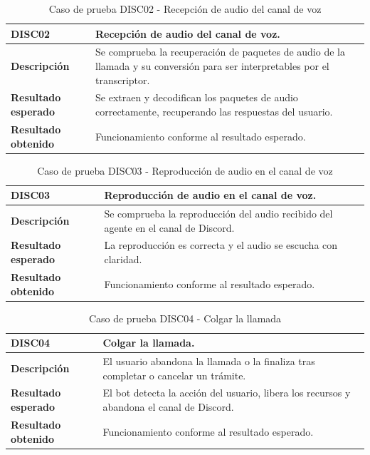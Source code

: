    \begin{table}[H]
        \centering
        \begin{tabular}{|l|p{12cm}|}
        \hline
        \textbf{DISC02} & Recepción de audio del canal de voz. \\ \hline
        \textbf{Descripción} & Se comprueba la recuperación de paquetes de audio de la llamada y su conversión para ser interpretables por el transcriptor. \\ \hline
        \textbf{Resultado esperado} & Se extraen y decodifican los paquetes de audio correctamente, recuperando las respuestas del usuario. \\ \hline
        \textbf{Resultado obtenido} & Funcionamiento conforme al resultado esperado. \\ \hline
        \end{tabular}
        \caption{Caso de prueba DISC02 - Recepción de audio del canal de voz}
    \end{table}

    \begin{table}[H]
        \centering
        \begin{tabular}{|l|p{12cm}|}
        \hline
        \textbf{DISC03} & Reproducción de audio en el canal de voz. \\ \hline
        \textbf{Descripción} & Se comprueba la reproducción del audio recibido del agente en el canal de Discord. \\ \hline
        \textbf{Resultado esperado} & La reproducción es correcta y el audio se escucha con claridad. \\ \hline
        \textbf{Resultado obtenido} & Funcionamiento conforme al resultado esperado. \\ \hline
        \end{tabular}
        \caption{Caso de prueba DISC03 - Reproducción de audio en el canal de voz}
    \end{table}

    \begin{table}[H]
        \centering
        \begin{tabular}{|l|p{12cm}|}
        \hline
        \textbf{DISC04} & Colgar la llamada. \\ \hline
        \textbf{Descripción} & El usuario abandona la llamada o la finaliza tras completar o cancelar un trámite. \\ \hline
        \textbf{Resultado esperado} & El bot detecta la acción del usuario, libera los recursos y abandona el canal de Discord. \\ \hline
        \textbf{Resultado obtenido} & Funcionamiento conforme al resultado esperado. \\ \hline
        \end{tabular}
        \caption{Caso de prueba DISC04 - Colgar la llamada}
    \end{table}

